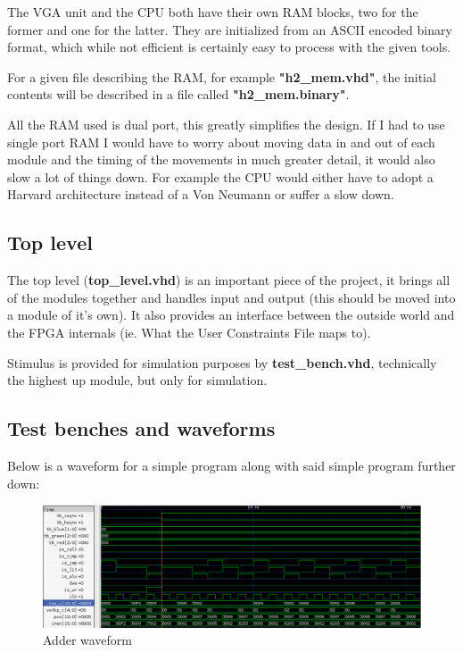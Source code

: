 \documentclass	[a4paper, 10pt]	{article}
\begin{document}
      The VGA unit and the CPU both have their own RAM blocks, two for the former and
      one for the latter. They are initialized from an ASCII encoded binary format,
      which while not efficient is certainly easy to process with the given tools.

      For a given file describing the RAM, for example \textbf{"h2\_mem.vhd"}, 
      the initial contents will be described in a file called \textbf{"h2\_mem.binary"}.

      All the RAM used is dual port, this greatly simplifies the design. If I had to use single
      port RAM I would have to worry about moving data in and out of each module and the
      timing of the movements in much greater detail, it would also slow a lot of things down. For example
      the CPU would either have to adopt a Harvard architecture instead of a Von Neumann 
      or suffer a slow down.

    \subsection{Top level}

    The top level (\textbf{top\_level.vhd}) is an important piece of the project, it brings all of
    the modules together and handles input and output (this should be moved into a module
    of it's own). It also provides an interface between the outside world and the FPGA internals
    (ie. What the User Constraints File maps to).

    Stimulus is provided for simulation purposes by \textbf{test\_bench.vhd}, technically the
    highest up module, but only for simulation. 

    \subsection{Test benches and waveforms}

      Below is a waveform for a simple program along with said simple program further down:

      \begin{figure}[ht]
        \hspace*{-3.5cm}
        \centering
        \includegraphics[width=1.6\textwidth]{pic/wav_adder.png}
        \caption{Adder waveform}
        \label{fig:Adder waveform}
      \end{figure}
      \FloatBarrier
\end{document}
